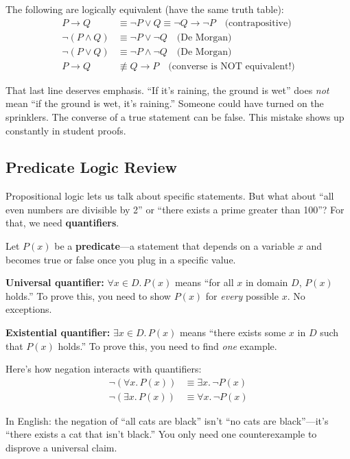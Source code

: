\begin{theorem}
The following are logically equivalent (have the same truth table):
\begin{align*}
P \to Q &\equiv \neg P \lor Q \equiv \neg Q \to \neg P \quad \text{(contrapositive)} \\
\neg(P \land Q) &\equiv \neg P \lor \neg Q \quad \text{(De Morgan)} \\
\neg(P \lor Q) &\equiv \neg P \land \neg Q \quad \text{(De Morgan)} \\
P \to Q &\not\equiv Q \to P \quad \text{(converse is NOT equivalent!)}
\end{align*}
\end{theorem}

That last line deserves emphasis. ``If it's raining, the ground is wet'' does \emph{not} mean ``if the ground is wet, it's raining.'' Someone could have turned on the sprinklers. The converse of a true statement can be false. This mistake shows up constantly in student proofs.

\subsection*{Predicate Logic Review}

Propositional logic lets us talk about specific statements. But what about ``all even numbers are divisible by 2'' or ``there exists a prime greater than 100''? For that, we need \textbf{quantifiers}.

\begin{definition}[Quantifiers]
Let $P(x)$ be a \textbf{predicate}---a statement that depends on a variable $x$ and becomes true or false once you plug in a specific value.

\textbf{Universal quantifier:} $\forall x \in D.\, P(x)$ means ``for all $x$ in domain $D$, $P(x)$ holds.'' To prove this, you need to show $P(x)$ for \emph{every} possible $x$. No exceptions.

\textbf{Existential quantifier:} $\exists x \in D.\, P(x)$ means ``there exists some $x$ in $D$ such that $P(x)$ holds.'' To prove this, you need to find \emph{one} example.
\end{definition}

\begin{theorem}
Here's how negation interacts with quantifiers:
\begin{align*}
\neg(\forall x.\, P(x)) &\equiv \exists x.\, \neg P(x) \\
\neg(\exists x.\, P(x)) &\equiv \forall x.\, \neg P(x)
\end{align*}

In English: the negation of ``all cats are black'' isn't ``no cats are black''---it's ``there exists a cat that isn't black.'' You only need one counterexample to disprove a universal claim.
\end{theorem}

